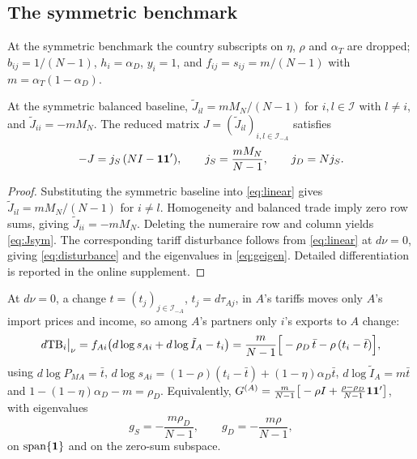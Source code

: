 \subsection{The symmetric benchmark}

At the symmetric benchmark the country subscripts on $\eta$, $\rho$ and $\alpha_T$ are dropped; $b_{ij}=1/(N-1)$, $h_i=\alpha_D$, $y_i=1$, and $f_{ij}=s_{ij}=m/(N-1)$ with $m=\alpha_T(1-\alpha_D)$.

\begin{lemma}
\label{lem:jacobian}
At the symmetric balanced baseline, $\widetilde J_{il}=mM_N/(N-1)$ for $i,l\in\mathcal I$ with $l\neq i$, and $\widetilde J_{ii}=-mM_N$. The reduced matrix $J=(\widetilde J_{il})_{i,l\in\mathcal I_{-A}}$ satisfies
\begin{equation}
-J=j_S\,(NI-\mathbf{1}\mathbf{1}'),\qquad j_S=\frac{mM_N}{N-1},\qquad j_D=Nj_S.
\label{eq:Jsym}
\end{equation}
\end{lemma}

\begin{proof}
Substituting the symmetric baseline into \cref{eq:linear} gives $\widetilde J_{il}=mM_N/(N-1)$ for $i\neq l$. Homogeneity and balanced trade imply zero row sums, giving $\widetilde J_{ii}=-mM_N$. Deleting the numeraire row and column yields \cref{eq:Jsym}. The corresponding tariff disturbance follows from \cref{eq:linear} at $d\nu=0$, giving \cref{eq:disturbance} and the eigenvalues in \cref{eq:geigen}. Detailed differentiation is reported in the online supplement.
\end{proof}

At $d\nu=0$, a change $t=(t_j)_{j\in\mathcal I_{-A}}$, $t_j=d\tau_{Aj}$, in $A$'s tariffs moves only $A$'s import prices and income, so among $A$'s partners only $i$'s exports to $A$ change:
\begin{equation}
d\mathrm{TB}_i\big|_{\nu}=f_{Ai}\big(d\log s_{Ai}+d\log\tilde I_A-t_i\big)=\frac{m}{N-1}\Big[-\rho_D\,\bar t-\rho\,(t_i-\bar t)\Big],
\label{eq:disturbance}
\end{equation}
using $d\log P_{MA}=\bar t$, $d\log s_{Ai}=(1-\rho)(t_i-\bar t)+(1-\eta)\alpha_D\bar t$, $d\log\tilde I_A=m\bar t$ and $1-(1-\eta)\alpha_D-m=\rho_D$. Equivalently, $G^{(A)}=\frac{m}{N-1}\big[-\rho I+\frac{\rho-\rho_D}{N-1}\mathbf{1}\mathbf{1}'\big]$, with eigenvalues
\begin{equation}
g_S=-\frac{m\rho_D}{N-1},\qquad g_D=-\frac{m\rho}{N-1},
\label{eq:geigen}
\end{equation}
on $\operatorname{span}\{\mathbf{1}\}$ and on the zero-sum subspace.

